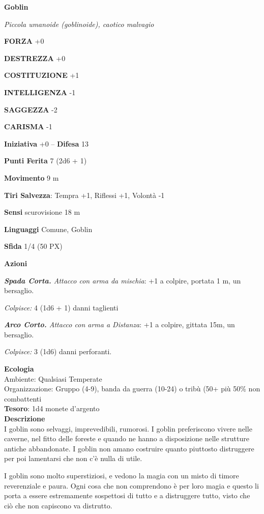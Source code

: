 \begin{multicols}{2}
	\medskip{}\textbf{Goblin}

	\textit{Piccola umanoide (goblinoide), caotico malvagio}

	\textbf{FORZA} +0

	\textbf{DESTREZZA} +0

	\textbf{COSTITUZIONE} +1

	\textbf{INTELLIGENZA} -1

	\textbf{SAGGEZZA} -2

	\textbf{CARISMA} -1

	\textbf{Iniziativa} +0 -- \textbf{Difesa} 13

	\textbf{Punti Ferita} 7 (2d6 + 1)

	\textbf{Movimento} 9 m

	\textbf{Tiri Salvezza}: Tempra +1, Riflessi +1, Volontà -1

	\textbf{Sensi} scurovisione 18 m

	\textbf{Linguaggi} Comune, Goblin

	\textbf{Sfida} 1/4 (50 PX)

	\textbf{Azioni}

	\textit{\textbf{Spada Corta.} Attacco con arma da mischia}: +1 a colpire, portata 1 m, un bersaglio.

	\textit{Colpisce:} 4 (1d6 + 1) danni taglienti

	\textit{\textbf{Arco Corto.} Attacco con arma a Distanza}: +1 a colpire, gittata 15m, un bersaglio.

	\textit{Colpisce:} 3 (1d6) danni perforanti.

	\textbf{Ecologia}\\
	Ambiente: Qualsiasi Temperate\\
	Organizzazione: Gruppo (4-9), banda da guerra (10-24) o tribù (50+ più 50\% non combattenti\\
	\textbf{Tesoro}: 1d4 monete d'argento\\
	\textbf{Descrizione}\\
	I goblin sono selvaggi, imprevedibili, rumorosi.
	I goblin preferiscono vivere nelle caverne, nel fitto delle foreste e quando ne hanno a disposizione nelle strutture antiche abbandonate. I goblin non amano costruire quanto piuttosto distruggere per poi lamentarsi che non c'è nulla di utile.

	I goblin sono molto superstiziosi, e vedono la magia con un misto di timore reverenziale e  paura. Ogni cosa che non comprendono è per loro magia e questo li porta a essere estremamente sospettosi di tutto e a distruggere tutto, visto che ciò che non capiscono va distrutto.


\end{multicols}
